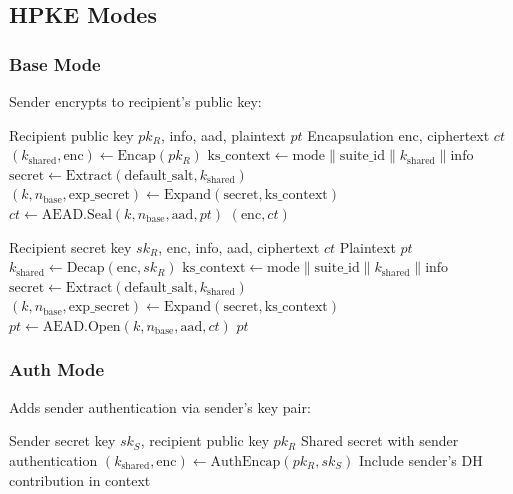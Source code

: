\documentclass[11pt,a4paper]{article}
\theoremstyle{definition}
\begin{document}
\subsection{HPKE Modes}

\subsubsection{Base Mode}

Sender encrypts to recipient's public key:

\begin{algorithm}
\caption{HPKE Base Mode Seal}
\begin{algorithmic}[1]
\Require Recipient public key $pk_R$, info, aad, plaintext $pt$
\Ensure Encapsulation $\text{enc}$, ciphertext $ct$
\State $(k_{\text{shared}}, \text{enc}) \gets \text{Encap}(pk_R)$
\State $\text{ks\_context} \gets \text{mode} \| \text{suite\_id} \| k_{\text{shared}} \| \text{info}$
\State $\text{secret} \gets \text{Extract}(\text{default\_salt}, k_{\text{shared}})$
\State $(k, n_{\text{base}}, \text{exp\_secret}) \gets \text{Expand}(\text{secret}, \text{ks\_context})$
\State $ct \gets \text{AEAD.Seal}(k, n_{\text{base}}, \text{aad}, pt)$
\State \Return $(\text{enc}, ct)$
\end{algorithmic}
\end{algorithm}

\begin{algorithm}
\caption{HPKE Base Mode Open}
\begin{algorithmic}[1]
\Require Recipient secret key $sk_R$, enc, info, aad, ciphertext $ct$
\Ensure Plaintext $pt$
\State $k_{\text{shared}} \gets \text{Decap}(\text{enc}, sk_R)$
\State $\text{ks\_context} \gets \text{mode} \| \text{suite\_id} \| k_{\text{shared}} \| \text{info}$
\State $\text{secret} \gets \text{Extract}(\text{default\_salt}, k_{\text{shared}})$
\State $(k, n_{\text{base}}, \text{exp\_secret}) \gets \text{Expand}(\text{secret}, \text{ks\_context})$
\State $pt \gets \text{AEAD.Open}(k, n_{\text{base}}, \text{aad}, ct)$
\State \Return $pt$
\end{algorithmic}
\end{algorithm}

\subsubsection{Auth Mode}

Adds sender authentication via sender's key pair:

\begin{algorithm}
\caption{HPKE Auth Mode Setup}
\begin{algorithmic}[1]
\Require Sender secret key $sk_S$, recipient public key $pk_R$
\Ensure Shared secret with sender authentication
\State $(k_{\text{shared}}, \text{enc}) \gets \text{AuthEncap}(pk_R, sk_S)$
\State Include sender's DH contribution in context
\end{algorithmic}
\end{algorithm}
\end{document}
